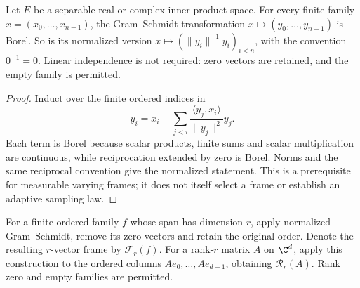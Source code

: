 \begin{lemma}
    \label{lem:borel_gram_schmidt}
    \leanok
    Let $E$ be a separable real or complex inner product space. For every
    finite family $x=(x_0,\ldots,x_{n-1})$, the Gram--Schmidt transformation
    $x\mapsto(y_0,\ldots,y_{n-1})$ is Borel. So is its normalized version
    $x\mapsto(\|y_i\|^{-1}y_i)_{i<n}$, with the convention $0^{-1}=0$.
    Linear independence is not required: zero vectors are retained, and
    the empty family is permitted.
\end{lemma}
\begin{proof}\leanok
    Induct over the finite ordered indices in
    \[
        y_i=x_i-\sum_{j<i}
          \frac{\langle y_j,x_i\rangle}{\|y_j\|^2}y_j.
    \]
    Each term is Borel because scalar products, finite sums and scalar
    multiplication are continuous, while reciprocation extended by zero
    is Borel. Norms and the same reciprocal convention give the normalized
    statement. This is a prerequisite for measurable varying frames; it
    does not itself select a frame or establish an adaptive sampling law.
\end{proof}


\begin{definition}
    \label{def:finite_ordered_orthonormal_frame}
    \leanok
    For a finite ordered family $f$ whose span has dimension $r$, apply
    normalized Gram--Schmidt, remove its zero vectors and retain the original
    order. Denote the resulting $r$-vector frame by $\mathcal F_r(f)$.
    For a rank-$r$ matrix $A$ on $\C^d$, apply this construction to the
    ordered columns $Ae_0,\ldots,Ae_{d-1}$, obtaining
    $\mathcal R_r(A)$. Rank zero and empty families are permitted.
\end{definition}

